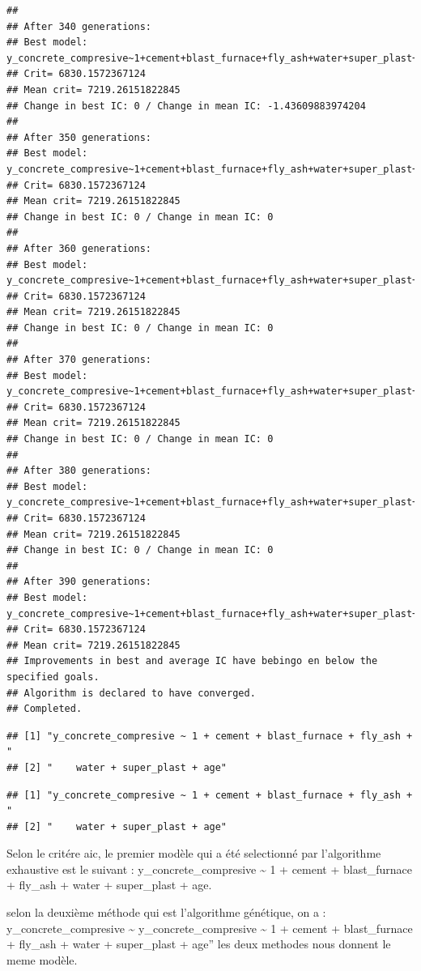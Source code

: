 \documentclass[
  12pt,
]{article}
\begin{document}
\begin{verbatim}
## 
## After 340 generations:
## Best model: y_concrete_compresive~1+cement+blast_furnace+fly_ash+water+super_plast+age
## Crit= 6830.1572367124
## Mean crit= 7219.26151822845
## Change in best IC: 0 / Change in mean IC: -1.43609883974204
## 
## After 350 generations:
## Best model: y_concrete_compresive~1+cement+blast_furnace+fly_ash+water+super_plast+age
## Crit= 6830.1572367124
## Mean crit= 7219.26151822845
## Change in best IC: 0 / Change in mean IC: 0
## 
## After 360 generations:
## Best model: y_concrete_compresive~1+cement+blast_furnace+fly_ash+water+super_plast+age
## Crit= 6830.1572367124
## Mean crit= 7219.26151822845
## Change in best IC: 0 / Change in mean IC: 0
## 
## After 370 generations:
## Best model: y_concrete_compresive~1+cement+blast_furnace+fly_ash+water+super_plast+age
## Crit= 6830.1572367124
## Mean crit= 7219.26151822845
## Change in best IC: 0 / Change in mean IC: 0
## 
## After 380 generations:
## Best model: y_concrete_compresive~1+cement+blast_furnace+fly_ash+water+super_plast+age
## Crit= 6830.1572367124
## Mean crit= 7219.26151822845
## Change in best IC: 0 / Change in mean IC: 0
## 
## After 390 generations:
## Best model: y_concrete_compresive~1+cement+blast_furnace+fly_ash+water+super_plast+age
## Crit= 6830.1572367124
## Mean crit= 7219.26151822845
## Improvements in best and average IC have bebingo en below the specified goals.
## Algorithm is declared to have converged.
## Completed.
\end{verbatim}

\begin{verbatim}
## [1] "y_concrete_compresive ~ 1 + cement + blast_furnace + fly_ash + "
## [2] "    water + super_plast + age"
\end{verbatim}

\begin{verbatim}
## [1] "y_concrete_compresive ~ 1 + cement + blast_furnace + fly_ash + "
## [2] "    water + super_plast + age"
\end{verbatim}

Selon le critére aic, le premier modèle qui a été selectionné par
l'algorithme exhaustive est le suivant : y\_concrete\_compresive
\textasciitilde{} 1 + cement + blast\_furnace + fly\_ash + water +
super\_plast + age.

selon la deuxième méthode qui est l'algorithme génétique, on a :
y\_concrete\_compresive \textasciitilde{} y\_concrete\_compresive
\textasciitilde{} 1 + cement + blast\_furnace + fly\_ash + water +
super\_plast + age'' les deux methodes nous donnent le meme modèle.
\end{document}
